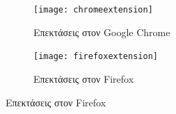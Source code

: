 \documentclass{article}
\begin{document}
\begin{figure}[H]
    \centering
    \begin{minipage}[t]{0.45\textwidth}
        \centering
        \begin{subfigure}[t]{\textwidth}
            \texttt{[image: chromeextension]}
        \caption{Επεκτάσεις στον Google Chrome}
        \label{Fig:chromesuccess}
        \end{subfigure}
        \vspace{\fill}
    \end{minipage}
    \hfill
    \begin{minipage}[t]{0.45\textwidth}
        \centering
        \begin{subfigure}[t]{\textwidth}
            \texttt{[image: firefoxextension]}
            \caption{Επεκτάσεις στον Firefox}
            \label{Fig:firefoxsuccess}
        \end{subfigure}
    \end{minipage}
\end{figure}
\end{document}
